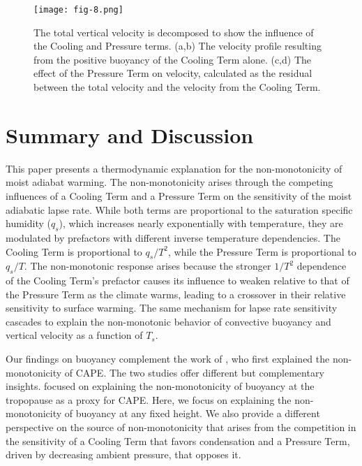 \documentclass[draft]{ametsocV6.1}
\begin{document}
\clearpage

\begin{figure}[htbp]
 \centering
 \texttt{[image: fig-8.png]}\\
 \caption{The total vertical velocity is decomposed to show the influence of the Cooling and Pressure terms. (a,b) The velocity profile resulting from the positive buoyancy of the Cooling Term alone. (c,d) The effect of the Pressure Term on velocity, calculated as the residual between the total velocity and the velocity from the Cooling Term.}\label{fig:fig-8}
\end{figure}


\section{Summary and Discussion}

This paper presents a thermodynamic explanation for the non-monotonicity of moist adiabat warming. The non-monotonicity arises through the competing influences of a Cooling Term and a Pressure Term on the sensitivity of the moist adiabatic lapse rate. While both terms are proportional to the saturation specific humidity ($q_s$), which increases nearly exponentially with temperature, they are modulated by prefactors with different inverse temperature dependencies. The Cooling Term is proportional to $q_s/T^2$, while the Pressure Term is proportional to $q_s/T$. The non-monotonic response arises because the stronger $1/T^2$ dependence of the Cooling Term's prefactor causes its influence to weaken relative to that of the Pressure Term as the climate warms, leading to a crossover in their relative sensitivity to surface warming. The same mechanism for lapse rate sensitivity cascades to explain the non-monotonic behavior of convective buoyancy and vertical velocity as a function of $T_s$.

Our findings on buoyancy complement the work of \cite{romps2016}, who first explained the non-monotonicity of CAPE. The two studies offer different but complementary insights. \cite{romps2016} focused on explaining the non-monotonicity of buoyancy at the tropopause as a proxy for CAPE. Here, we focus on explaining the non-monotonicity of buoyancy at any fixed height. We also provide a different perspective on the source of non-monotonicity that arises from the competition in the sensitivity of a Cooling Term that favors condensation and a Pressure Term, driven by decreasing ambient pressure, that opposes it.
\end{document}
